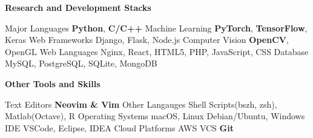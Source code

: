 
\vspace{-1em}
\begin{multicols}{2}
\textbf{Research and Development Stacks}
\vspace{-1em}
\begin{cvskills}
\cvskill
{Major Languages}
{\textbf{Python}, \textbf{C/C++}}
\cvskill
{Machine Learning}
{\textbf{PyTorch}, \textbf{TensorFlow}, Keras}
\cvskill
{Web Frameworks}
{Django, Flask, Node.js}
\cvskill
{Computer Vision}
{\textbf{OpenCV}, OpenGL}
\cvskill
{Web Languages} %
{Nginx, React, HTML5, PHP, JavaScript, CSS} %
\cvskill
{Database}
{MySQL, PostgreSQL, SQLite, MongoDB}
\end{cvskills}

\textbf{Other Tools and Skills}
\vspace{-1em}
\begin{cvskills}
  \cvskill
    {Text Editors}
    {\textbf{Neovim \& Vim}}
  \cvskill
    {Other Langauges} %
    {Shell Scripts(bszh, zsh), Matlab(Octave), R} %
  \cvskill
    {Operating Systems} %
    {macOS, Linux Debian/Ubuntu, Windows}
  \cvskill
    {IDE} %
    {VSCode, Eclipse, IDEA} %
  \cvskill
    {Cloud Platforms} %
    {AWS} %
  \cvskill
    {VCS}
    {\textbf{Git}} %
\end{cvskills}

\end{multicols}
\vspace{-0.5em}
